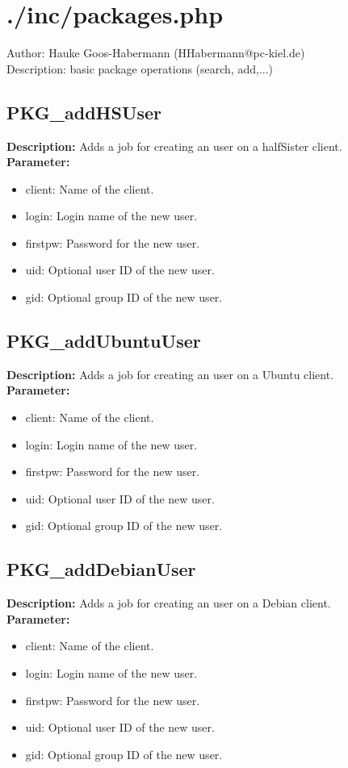 \newpage\section{./inc/packages.php}
Author: Hauke Goos-Habermann (HHabermann@pc-kiel.de)\\
Description: basic package operations (search, add,...)\\

\subsection{PKG\_addHSUser}
\textbf{Description:} Adds a job for creating an user on a halfSister client.\\
\textbf{Parameter:}
\begin{itemize}
\item client: Name of the client.
\item login: Login name of the new user.
\item firstpw: Password for the new user.
\item uid: Optional user ID of the new user.
\item gid: Optional group ID of the new user.
\end{itemize}

\subsection{PKG\_addUbuntuUser}
\textbf{Description:} Adds a job for creating an user on a Ubuntu client.\\
\textbf{Parameter:}
\begin{itemize}
\item client: Name of the client.
\item login: Login name of the new user.
\item firstpw: Password for the new user.
\item uid: Optional user ID of the new user.
\item gid: Optional group ID of the new user.
\end{itemize}

\subsection{PKG\_addDebianUser}
\textbf{Description:} Adds a job for creating an user on a Debian client.\\
\textbf{Parameter:}
\begin{itemize}
\item client: Name of the client.
\item login: Login name of the new user.
\item firstpw: Password for the new user.
\item uid: Optional user ID of the new user.
\item gid: Optional group ID of the new user.
\end{itemize}

